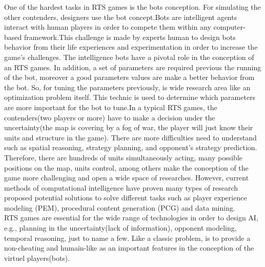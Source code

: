 \documentclass[conference]{IEEEtran}
\begin{document}
One of the hardest tasks in RTS games is the bots conception. For simulating the other contenders, designers use the bot concept.Bots are intelligent agents interact with human players in order to compete them within any computer-based framework\cite{doc4}.This challenge is made by experts human to design bots behavior from their life experiences and experimentation in order to increase the game's challenges.\cite{doc3} The intelligence bots have a pivotal role\cite{doc4} in the conception of an RTS games. In addition, a set of parameters are required previous the running of the bot, moreover a good parameters values are make a better behavior from the bot. So, for tuning the parameters previously, is wide research area like an optimization problem itself.\cite{doc1} This technic is used to determine which parameters are more important for the bot to tune.\cite{doc1}In a typical RTS games, the contenders(two players or more) have to make a decision under the uncertainty\cite{doc4}(the map is covering by a fog of war, the player will just know their units and structure in the game). There are more difficulties need to understand\cite{doc4} such as spatial reasoning, strategy planning, and opponent's strategy prediction. Therefore, there are hundreds of units simultaneously acting, many possible positions on the map, units control, among others make the conception of the game more challenging and open a wide space of researches. However, current methods of computational intelligence have proven many types of research proposed potential solutions to solve different tasks such as player experience modeling (PEM), procedural content generation (PCG) and data mining\cite{doc2}.\\

RTS games are essential for the wide range of technologies\cite{doc5} in order to design AI, e.g., planning in the uncertainty(lack of information), opponent modeling, temporal reasoning, just to name a few. Like a classic problem, is to provide a non-cheating and humain-like as an important features in the conception of the virtuel players(bots).         


 
\end{document}
